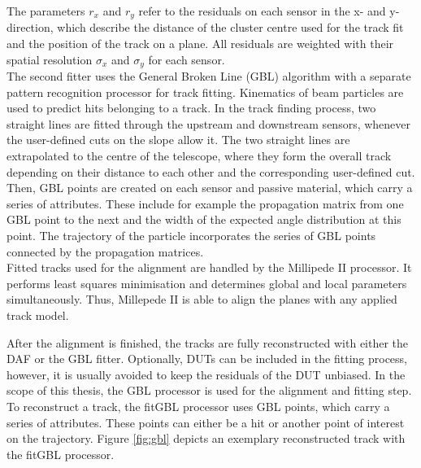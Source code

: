 The parameters $r_x$ and $r_y$ refer to the residuals on each sensor in the x- and y-direction, which describe the distance of the cluster centre used for the track fit and the
position of the track on a plane. All residuals are weighted with their spatial resolution $\sigma_x$ and $\sigma_y$ for each sensor. \\
The second fitter uses the General Broken Line (GBL) algorithm with a separate pattern recognition processor for track fitting. Kinematics of
beam particles are used to predict hits belonging to a track. In the track finding process, two straight lines are fitted through the upstream and
downstream sensors, whenever the user-defined cuts on the slope allow it. The two straight lines are extrapolated to the centre of the telescope, where
they form the overall track depending on their distance to each other and the corresponding user-defined cut.  Then, GBL points are created on each sensor and
passive material, which
carry a series of attributes. These include for example the
propagation matrix from one GBL point to the next and the width of the expected angle distribution at this point. The trajectory of the particle incorporates the series of GBL points
connected by the propagation matrices.\\
Fitted tracks used for the alignment are handled by the Millipede II processor. It performs least squares minimisation and determines global and local
parameters simultaneously. Thus, Millepede II is able to align the planes with any applied track model.

After the alignment is finished, the tracks are fully reconstructed with either the DAF or the GBL fitter. Optionally, DUTs can be included in the fitting
process, however, it is usually avoided to keep the residuals of the DUT unbiased. In the scope of this thesis, the GBL processor is used for the
alignment and fitting step. To reconstruct a track, the fitGBL processor uses GBL points, which carry a series of attributes. These points can either be a
hit or another point of interest on the trajectory. Figure \ref{fig:gbl} depicts an exemplary reconstructed track with the fitGBL processor.

